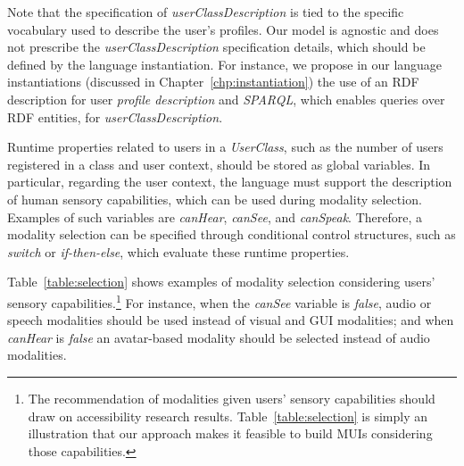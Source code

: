 \documentclass[
  doutorado,
  american
]{ThesisPUC}
\newcommand{\tab}[1]{Table~\ref{#1}}
\newcommand{\chp}[1]{Chapter~\ref{#1}}
\begin{document}
Note that the specification of \textit{userClassDescription} is tied to the
specific vocabulary used to describe the user’s profiles. Our model is agnostic
and does not prescribe the \textit{userClassDescription} specification details,
which should be defined by the language instantiation. For instance, we propose
in our language instantiations (discussed in \chp{chp:instantiation}) the use
of an RDF description for user 
\textit{profile description }and \textit{SPARQL}, which enables queries over RDF
entities, for 
\textit{userClassDescription}.

Runtime properties related to users in a \textit{UserClass}, such as the number
of users registered in a class and user context, should be stored as global
variables. In particular, regarding the user context, the language must support
the description of human sensory capabilities, which can be used during modality
selection. Examples of such variables are \textit{canHear}, \textit{canSee}, and
\textit{canSpeak}. Therefore, a modality selection can be specified through
conditional control structures, such as \textit{switch }or
\textit{if-then-else}, which evaluate these runtime properties.

\tab{table:selection} shows examples of modality selection considering users’
sensory capabilities.\footnote{The recommendation of modalities given users’
sensory capabilities should draw on accessibility research results. 
\tab{table:selection} is simply an illustration that our approach makes it
feasible to build MUIs considering those capabilities.} For instance, when the
\textit{canSee} variable is 
\textit{false}, audio or speech modalities should be used instead of visual and
GUI modalities; and when \textit{canHear} is \textit{false} an avatar-based
modality should be selected instead of audio modalities.
\end{document}
